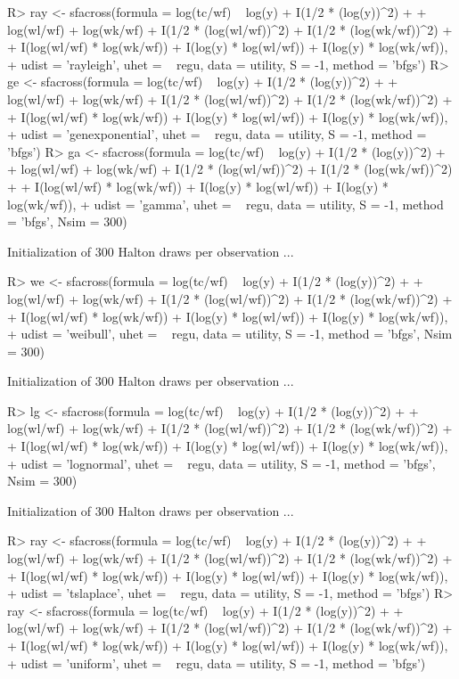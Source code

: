 \documentclass[nojss]{jss}
\begin{document}
\begin{Schunk}
\begin{Sinput}
R> ray <- sfacross(formula = log(tc/wf) ~ log(y) + I(1/2 * (log(y))^2) +
+   log(wl/wf) + log(wk/wf) + I(1/2 * (log(wl/wf))^2) + I(1/2 * (log(wk/wf))^2) +
+   I(log(wl/wf) * log(wk/wf)) + I(log(y) * log(wl/wf)) + I(log(y) * log(wk/wf)),
+   udist = 'rayleigh', uhet = ~ regu, data = utility, S = -1, method = 'bfgs')
R> ge <- sfacross(formula = log(tc/wf) ~ log(y) + I(1/2 * (log(y))^2) +
+   log(wl/wf) + log(wk/wf) + I(1/2 * (log(wl/wf))^2) + I(1/2 * (log(wk/wf))^2) +
+   I(log(wl/wf) * log(wk/wf)) + I(log(y) * log(wl/wf)) + I(log(y) * log(wk/wf)),
+   udist = 'genexponential', uhet = ~ regu, data = utility, S = -1, method = 'bfgs')
R> ga <- sfacross(formula = log(tc/wf) ~ log(y) + I(1/2 * (log(y))^2) +
+   log(wl/wf) + log(wk/wf) + I(1/2 * (log(wl/wf))^2) + I(1/2 * (log(wk/wf))^2) +
+   I(log(wl/wf) * log(wk/wf)) + I(log(y) * log(wl/wf)) + I(log(y) * log(wk/wf)),
+   udist = 'gamma', uhet = ~ regu, data = utility, S = -1, method = 'bfgs', Nsim = 300)
\end{Sinput}
\begin{Soutput}
Initialization of 300 Halton draws per observation ...
\end{Soutput}
\begin{Sinput}
R> we <- sfacross(formula = log(tc/wf) ~ log(y) + I(1/2 * (log(y))^2) +
+   log(wl/wf) + log(wk/wf) + I(1/2 * (log(wl/wf))^2) + I(1/2 * (log(wk/wf))^2) +
+   I(log(wl/wf) * log(wk/wf)) + I(log(y) * log(wl/wf)) + I(log(y) * log(wk/wf)),
+   udist = 'weibull', uhet = ~ regu, data = utility, S = -1, method = 'bfgs', Nsim = 300)
\end{Sinput}
\begin{Soutput}
Initialization of 300 Halton draws per observation ...
\end{Soutput}
\begin{Sinput}
R> lg <- sfacross(formula = log(tc/wf) ~ log(y) + I(1/2 * (log(y))^2) +
+   log(wl/wf) + log(wk/wf) + I(1/2 * (log(wl/wf))^2) + I(1/2 * (log(wk/wf))^2) +
+   I(log(wl/wf) * log(wk/wf)) + I(log(y) * log(wl/wf)) + I(log(y) * log(wk/wf)),
+   udist = 'lognormal', uhet = ~ regu, data = utility, S = -1, method = 'bfgs', Nsim = 300)
\end{Sinput}
\begin{Soutput}
Initialization of 300 Halton draws per observation ...
\end{Soutput}
\begin{Sinput}
R> ray <- sfacross(formula = log(tc/wf) ~ log(y) + I(1/2 * (log(y))^2) +
+   log(wl/wf) + log(wk/wf) + I(1/2 * (log(wl/wf))^2) + I(1/2 * (log(wk/wf))^2) +
+   I(log(wl/wf) * log(wk/wf)) + I(log(y) * log(wl/wf)) + I(log(y) * log(wk/wf)),
+   udist = 'tslaplace', uhet = ~ regu, data = utility, S = -1, method = 'bfgs')
R> ray <- sfacross(formula = log(tc/wf) ~ log(y) + I(1/2 * (log(y))^2) +
+   log(wl/wf) + log(wk/wf) + I(1/2 * (log(wl/wf))^2) + I(1/2 * (log(wk/wf))^2) +
+   I(log(wl/wf) * log(wk/wf)) + I(log(y) * log(wl/wf)) + I(log(y) * log(wk/wf)),
+   udist = 'uniform', uhet = ~ regu, data = utility, S = -1, method = 'bfgs')
\end{Sinput}
\end{Schunk}
\end{document}
